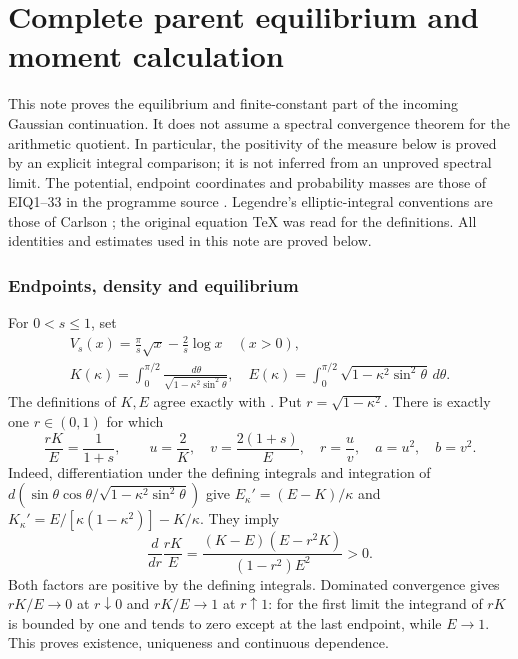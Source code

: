 \documentclass[11pt]{article}
\begin{document}
\endgroup

\clearpage\begingroup
\part*{Complete parent equilibrium and moment calculation}
\newtheorem{osdgmtheorem}{Theorem}\newtheorem{osdgmlemma}[osdgmtheorem]{Lemma}
\newcommand{\osdgmdd}{\,d}\newcommand{\osdgmR}{\mathbb R}

This note proves the equilibrium and finite-constant part of the incoming
Gaussian continuation. It does not assume a spectral convergence theorem
for the arithmetic quotient. In particular, the positivity of the measure
below is proved by an explicit integral comparison; it is not inferred
from an unproved spectral limit. The potential, endpoint coordinates and
probability masses are those of EIQ1--33 in the programme source
\cite{osdgm:EIQ}. Legendre's elliptic-integral conventions are those of Carlson
\cite{osdgm:Carlson}; the original equation TeX was read for the definitions.
All identities and estimates used in this note are proved below.

\section{Endpoints, density and equilibrium}
For $0<s\le1$, set
\begin{equation}\tag{GM1}
 \begin{gathered}
 V_s(x)=\frac\pi s\sqrt x-\frac2s\log x\quad(x>0),\qquad
 \\
 K(\kappa)=\int_0^{\pi/2}\frac{\osdgmdd\theta}{\sqrt{1-\kappa^2\sin^2\theta}},
 \quad E(\kappa)=\int_0^{\pi/2}\sqrt{1-\kappa^2\sin^2\theta}\osdgmdd\theta.
 \end{gathered}
\end{equation}
The definitions of $K,E$ agree exactly with \cite[19.2.4, 19.2.5,
19.2.8(a,b)]{osdgm:Carlson}. Put $r=\sqrt{1-\kappa^2}$. There is exactly one
$r\in(0,1)$ for which
\begin{equation}\tag{GM2}
 \frac{rK}{E}=\frac1{1+s},\qquad
 u=\frac2K,\quad v=\frac{2(1+s)}E,\quad r=\frac uv,
 \quad a=u^2,\quad b=v^2.
\end{equation}
Indeed, differentiation under the defining integrals and integration of
$d(\sin\theta\cos\theta/\sqrt{1-\kappa^2\sin^2\theta})$ give
$E_\kappa'=(E-K)/\kappa$ and
$K_\kappa'=E/[\kappa(1-\kappa^2)]-K/\kappa$.
They imply
\begin{equation}\tag{GM3}
 \frac{d}{dr}\frac{rK}E
 =\frac{(K-E)(E-r^2K)}{(1-r^2)E^2}>0.
\end{equation}
Both factors are positive by the defining integrals. Dominated convergence
gives $rK/E\to0$ at $r\downarrow0$ and $rK/E\to1$ at $r\uparrow1$:
for the first limit the integrand of $rK$ is bounded by one and tends
to zero except at the last endpoint, while $E\to1$.
This proves existence, uniqueness and continuous dependence.
\end{document}
